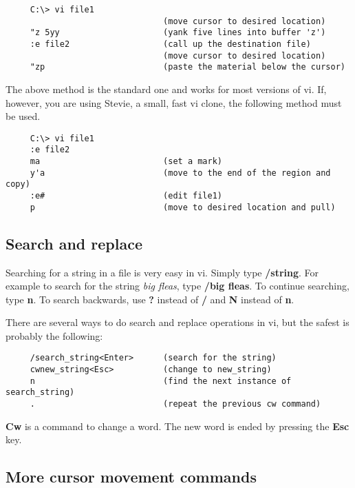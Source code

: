 \begin{verbatim}
     C:\> vi file1
                                (move cursor to desired location)
     "z 5yy                     (yank five lines into buffer 'z')
     :e file2                   (call up the destination file)
                                (move cursor to desired location)
     "zp                        (paste the material below the cursor)
\end{verbatim}

The above method is the standard one and works for most versions of vi.
If, however, you are using Stevie, a small, fast vi clone, the following
method must be used.

\begin{verbatim}
     C:\> vi file1
     :e file2
     ma                         (set a mark)
     y'a                        (move to the end of the region and copy)
     :e#                        (edit file1)
     p                          (move to desired location and pull)
\end{verbatim}

\subsection{Search and replace}

Searching for a string in a file is very easy in vi. Simply type {\bf /string}.
For example to search for the string {\em big fleas}, type {\bf /big
fleas}. To continue searching, type {\bf n}. To search backwards, use
{\bf ?} instead of {\bf /} and {\bf N} instead of {\bf n}.

There are several ways to do search and replace operations in vi, but the 
safest is probably the following:

\begin{verbatim}
     /search_string<Enter>      (search for the string)
     cwnew_string<Esc>          (change to new_string)
     n                          (find the next instance of search_string)
     .                          (repeat the previous cw command)
\end{verbatim}

{\bf Cw} is a command to change a word. The new word is ended by pressing
the {\bf Esc} key.

\subsection{More cursor movement commands}


